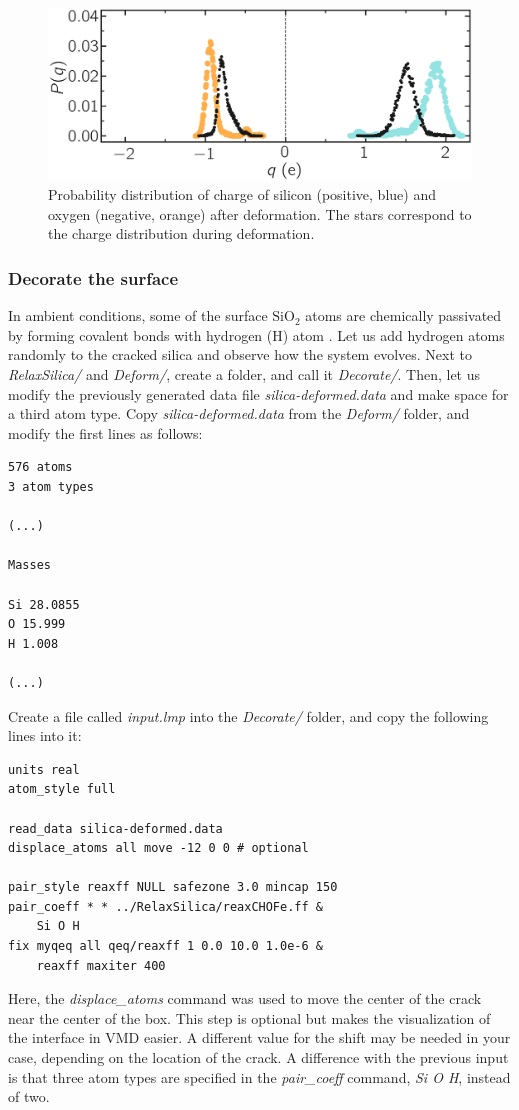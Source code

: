 \documentclass[9pt,tutorial]{livecoms}
\begin{document}
\begin{figure}
\includegraphics[width=\linewidth]{SIO-distribution-bis}
\caption{Probability distribution of charge of silicon (positive, blue) and oxygen
(negative, orange) after deformation. The stars correspond to the charge distribution
during deformation.}
\label{fig:SIO-distribution-bis}
\end{figure}

\subsubsection{Decorate the surface}
In ambient conditions, some of the surface $\text{SiO}_2$ atoms are chemically
passivated by forming covalent bonds with hydrogen (H) atom \cite{sulpizi2012silica}.
Let us add hydrogen atoms randomly to the cracked silica and observe how the
system evolves.  Next to \textit{RelaxSilica/} and \textit{Deform/}, create a folder,
and call it \textit{Decorate/}. Then, let us modify the previously generated data
file \textit{silica-deformed.data} and make space for a third atom type.
Copy \textit{silica-deformed.data} from the \textit{Deform/} folder, and modify
the first lines as follows:
\begin{lstlisting}
576 atoms
3 atom types

(...)

Masses

Si 28.0855
O 15.999
H 1.008

(...)
\end{lstlisting}
Create a file called \textit{input.lmp} into the \textit{Decorate/} folder, and
copy the following lines into it:
\begin{lstlisting}
units real
atom_style full

read_data silica-deformed.data
displace_atoms all move -12 0 0 # optional

pair_style reaxff NULL safezone 3.0 mincap 150
pair_coeff * * ../RelaxSilica/reaxCHOFe.ff &
    Si O H
fix myqeq all qeq/reaxff 1 0.0 10.0 1.0e-6 &
    reaxff maxiter 400
\end{lstlisting}
Here, the \textit{displace\_atoms} command was used to move the center of the
crack near the center of the box. This step is optional but makes the visualization
of the interface in VMD easier. A different value for the shift may be needed in
your case, depending on the location of the crack. A difference with the previous
input is that three atom types are specified in the \textit{pair\_coeff} command,
\textit{Si O H}, instead of two.
\end{document}
